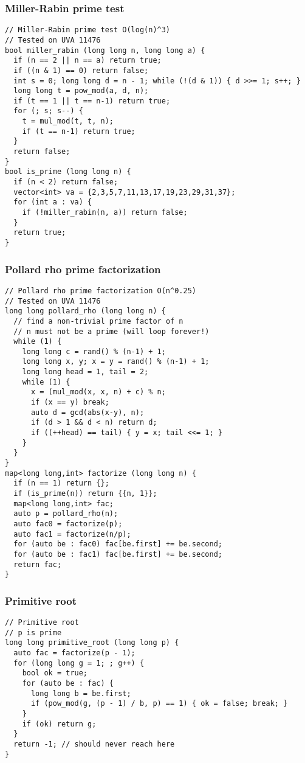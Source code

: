 \documentclass[10pt,landscape]{article}
\begin{document}
\begin{multicols}{2}
\subsubsection{Miller-Rabin prime test}
\begin{lstlisting}
// Miller-Rabin prime test O(log(n)^3)
// Tested on UVA 11476
bool miller_rabin (long long n, long long a) {
  if (n == 2 || n == a) return true;
  if ((n & 1) == 0) return false;
  int s = 0; long long d = n - 1; while (!(d & 1)) { d >>= 1; s++; }
  long long t = pow_mod(a, d, n);
  if (t == 1 || t == n-1) return true;
  for (; s; s--) {
    t = mul_mod(t, t, n);
    if (t == n-1) return true;
  }
  return false;
}
bool is_prime (long long n) {
  if (n < 2) return false;
  vector<int> va = {2,3,5,7,11,13,17,19,23,29,31,37};
  for (int a : va) {
    if (!miller_rabin(n, a)) return false;
  }
  return true;
}
\end{lstlisting}
\subsubsection{Pollard rho prime factorization}
\begin{lstlisting}
// Pollard rho prime factorization O(n^0.25)
// Tested on UVA 11476
long long pollard_rho (long long n) {
  // find a non-trivial prime factor of n
  // n must not be a prime (will loop forever!)
  while (1) {
    long long c = rand() % (n-1) + 1;
    long long x, y; x = y = rand() % (n-1) + 1;
    long long head = 1, tail = 2;
    while (1) {
      x = (mul_mod(x, x, n) + c) % n;
      if (x == y) break;
      auto d = gcd(abs(x-y), n);
      if (d > 1 && d < n) return d;
      if ((++head) == tail) { y = x; tail <<= 1; }
    }
  }
}
map<long long,int> factorize (long long n) {
  if (n == 1) return {};
  if (is_prime(n)) return {{n, 1}};
  map<long long,int> fac;
  auto p = pollard_rho(n);
  auto fac0 = factorize(p);
  auto fac1 = factorize(n/p);
  for (auto be : fac0) fac[be.first] += be.second;
  for (auto be : fac1) fac[be.first] += be.second;
  return fac;
}
\end{lstlisting}
\subsubsection{Primitive root}
\begin{lstlisting}
// Primitive root
// p is prime
long long primitive_root (long long p) {
  auto fac = factorize(p - 1);
  for (long long g = 1; ; g++) {
    bool ok = true;
    for (auto be : fac) {
      long long b = be.first;
      if (pow_mod(g, (p - 1) / b, p) == 1) { ok = false; break; }
    }
    if (ok) return g;
  }
  return -1; // should never reach here
}
\end{lstlisting}

\end{multicols}
\end{document}
